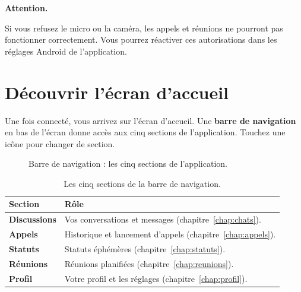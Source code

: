 \documentclass[11pt,a4paper,oneside]{report}
\newcommand{\bouton}[1]{\textbf{\textsf{#1}}}
\newcommand{\thd}[1]{\textbf{\textcolor{AlanyaIndigoDark}{#1}}}
\newenvironment{attention}{%
  \begin{tcolorbox}[enhanced, frame hidden, interior hidden,
    borderline west={3pt}{0pt}{AlanyaAmber}, left=10pt, top=3pt, bottom=3pt,
    sharp corners, colback=white, before skip=\medskipamount, after skip=\medskipamount]%
  \small\textbf{\textcolor{AlanyaAmber}{Attention.}}\space\ignorespaces
}{\end{tcolorbox}}
\begin{document}
\begin{attention}
Si vous refusez le micro ou la cam\'{e}ra, les appels et r\'{e}unions ne pourront pas
fonctionner correctement. Vous pourrez r\'{e}activer ces autorisations dans les
r\'{e}glages Android de l'application.
\end{attention}

\section{D\'{e}couvrir l'\'{e}cran d'accueil}
Une fois connect\'{e}, vous arrivez sur l'\'{e}cran d'accueil. Une \textbf{barre de
navigation} en bas de l'\'{e}cran donne acc\`{e}s aux cinq sections de l'application.
Touchez une ic\^{o}ne pour changer de section.

\begin{figure}[H]
\centering
{}
\caption{Barre de navigation : les cinq sections de l'application.}
\label{fig:nav}
\end{figure}

\begin{table}[H]
\centering\small
\begin{tabularx}{\linewidth}{@{}l X@{}}
\toprule
\thd{Section} & \thd{R\^{o}le}\\
\midrule
\bouton{Discussions} & Vos conversations et messages (chapitre~\ref{chap:chats}).\\
\bouton{Appels}      & Historique et lancement d'appels (chapitre~\ref{chap:appels}).\\
\bouton{Statuts}     & Statuts \'{e}ph\'{e}m\`{e}res (chapitre~\ref{chap:statuts}).\\
\bouton{R\'{e}unions} & R\'{e}unions planifi\'{e}es (chapitre~\ref{chap:reunions}).\\
\bouton{Profil}      & Votre profil et les r\'{e}glages (chapitre~\ref{chap:profil}).\\
\bottomrule
\end{tabularx}
\caption{Les cinq sections de la barre de navigation.}
\end{table}
\end{document}
